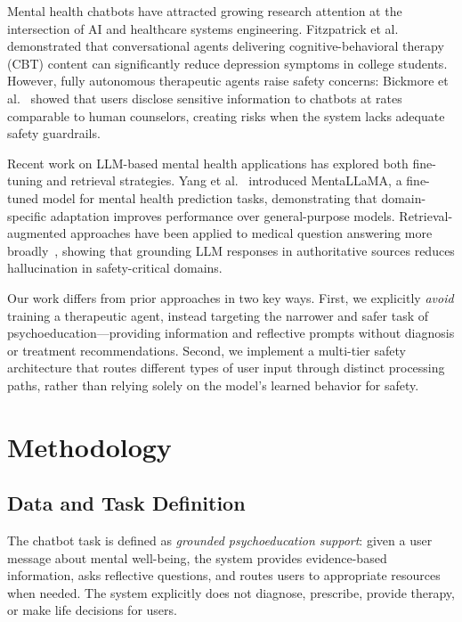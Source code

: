 \documentclass[conference]{IEEEtran}
\begin{document}
Mental health chatbots have attracted growing research attention at the intersection of AI and healthcare systems engineering. Fitzpatrick et al.~\cite{fitzpatrick2017} demonstrated that conversational agents delivering cognitive-behavioral therapy (CBT) content can significantly reduce depression symptoms in college students. However, fully autonomous therapeutic agents raise safety concerns: Bickmore et al.~\cite{bickmore2010} showed that users disclose sensitive information to chatbots at rates comparable to human counselors, creating risks when the system lacks adequate safety guardrails.

Recent work on LLM-based mental health applications has explored both fine-tuning and retrieval strategies. Yang et al.~\cite{yang2023mentalllama} introduced MentaLLaMA, a fine-tuned model for mental health prediction tasks, demonstrating that domain-specific adaptation improves performance over general-purpose models. Retrieval-augmented approaches have been applied to medical question answering more broadly~\cite{xiong2024benchmarking}, showing that grounding LLM responses in authoritative sources reduces hallucination in safety-critical domains.

Our work differs from prior approaches in two key ways. First, we explicitly \emph{avoid} training a therapeutic agent, instead targeting the narrower and safer task of psychoeducation---providing information and reflective prompts without diagnosis or treatment recommendations. Second, we implement a multi-tier safety architecture that routes different types of user input through distinct processing paths, rather than relying solely on the model's learned behavior for safety.

\section{Methodology}

\subsection{Data and Task Definition}

The chatbot task is defined as \textit{grounded psychoeducation support}: given a user message about mental well-being, the system provides evidence-based information, asks reflective questions, and routes users to appropriate resources when needed. The system explicitly does not diagnose, prescribe, provide therapy, or make life decisions for users.
\end{document}
